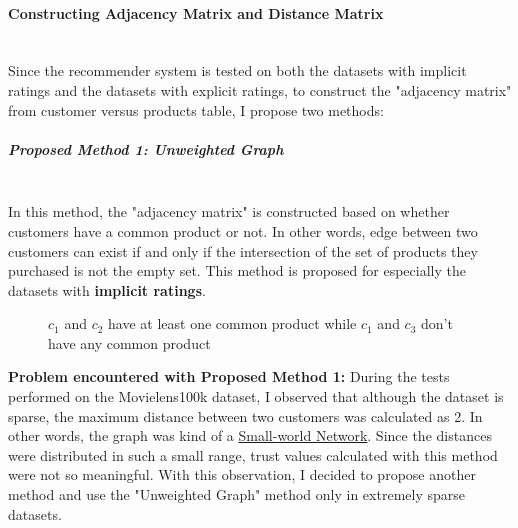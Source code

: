 	\paragraph{Constructing Adjacency Matrix and Distance Matrix}\mbox{}\\
	Since the recommender system is tested on both the datasets with implicit ratings and the datasets with explicit ratings, to construct the "adjacency matrix" from customer versus products table, I propose two methods: 
	\subparagraph{Proposed Method 1: Unweighted Graph}\mbox{}\\
	\label{prop_method_1}
	In this method, the "adjacency matrix" is constructed based on whether customers have a common product or not. In other words, edge between two customers can exist if and only if the intersection of the set of products they purchased is not the empty set. This method is proposed for especially the datasets with \textbf{implicit ratings}.
	\begin{figure}[H]
		\centering
		\caption{$c_{1}$ and $c_{2}$ have at least one common product while $c_{1}$ and $c_{3}$ don't have any common product}
	\end{figure}

	\textbf{Problem encountered with Proposed Method 1:} During the tests performed on the Movielens100k dataset, I observed that although the dataset is sparse, the maximum distance between two customers was calculated as 2. In other words, the graph was kind of a \href{https://en.wikipedia.org/wiki/Small-world_network}{Small-world Network}. Since the distances were distributed in such a small range, trust values calculated with this method were not so meaningful. With this observation, I decided to propose another method and use the "Unweighted Graph" method only in extremely sparse datasets.
	
